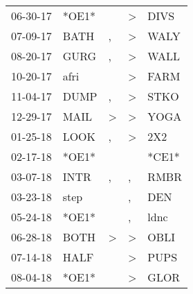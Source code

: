 \begin{supertabular}{p{0.07\textwidth}p{0.06\textwidth}p{0.02\textwidth}p{0.02\textwidth}p{0.06\textwidth}}
          06-30-17\textsuperscript{} &                            *OE1* &                  &     \textgreater &           DIVS\textsuperscript{} \\
          07-09-17\textsuperscript{} &           BATH\textsuperscript{} &                , &     \textgreater &           WALY\textsuperscript{} \\
          08-20-17\textsuperscript{} &           GURG\textsuperscript{} &                , &     \textgreater &           WALL\textsuperscript{} \\
          10-20-17\textsuperscript{} &           afri\textsuperscript{} &                  &     \textgreater &           FARM\textsuperscript{} \\
          11-04-17\textsuperscript{} &           DUMP\textsuperscript{} &                , &     \textgreater &           STKO\textsuperscript{} \\
          12-29-17\textsuperscript{} &           MAIL\textsuperscript{} &     \textgreater &     \textgreater &           YOGA\textsuperscript{} \\
          01-25-18\textsuperscript{} &           LOOK\textsuperscript{} &                , &     \textgreater &            2X2\textsuperscript{} \\
          02-17-18\textsuperscript{} &                            *OE1* &                  &                  &                            *CE1* \\
          03-07-18\textsuperscript{} &           INTR\textsuperscript{} &                , &                , &           RMBR\textsuperscript{} \\
          03-23-18\textsuperscript{} &           step\textsuperscript{} &                  &                , &            DEN\textsuperscript{} \\
          05-24-18\textsuperscript{} &                            *OE1* &                  &                , &           ldnc\textsuperscript{} \\
          06-28-18\textsuperscript{} &           BOTH\textsuperscript{} &     \textgreater &     \textgreater &           OBLI\textsuperscript{} \\
          07-14-18\textsuperscript{} &           HALF\textsuperscript{} &                  &     \textgreater &           PUPS\textsuperscript{} \\
          08-04-18\textsuperscript{} &                            *OE1* &                  &     \textgreater &           GLOR\textsuperscript{} \\

\end{supertabular}
